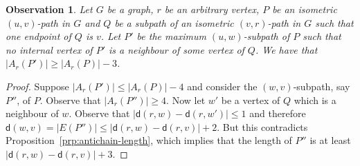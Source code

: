 \documentclass[a4paper]{article}
\newcommand{\dist}[2]{\mathsf{d}\left(#1,#2\right)}
\newcommand{\anticp}[2]{A_{#1}\left(#2\right)}
\newtheorem{observation}[theorem]{Observation}
\newtheorem{definition}[theorem]{Definition}
\begin{document}



\begin{observation}\label{obs:anti-cp-reduc}
\sloppy Let $G$ be a graph, $r$ be an arbitrary vertex, $P$ be an isometric $(u,v)$-path in $G$ and $Q$ be a subpath of an isometric $(v,r)$-path in $G$ such that one endpoint of $Q$ is $v$. Let $P'$ be the maximum $(u,w)$-subpath of $P$ such that no internal vertex of $P'$ is a neighbour of some vertex of $Q$. We have that $|\anticp{r}{P'}| \geq |\anticp{r}{P}| - 3$. 
\end{observation}

 \begin{proof}
 Suppose $|\anticp{r}{P'}| \leq |\anticp{r}{P}| - 4$ and consider the $(w,v)$-subpath, say $P''$, of $P$. Observe that $|\anticp{r}{P''}| \geq 4$. Now let $w'$ be a vertex of $Q$ which is a neighbour of $w$. Observe that $|\dist{r}{w} - \dist{r}{w'}| \leq 1$ and therefore $\dist{w}{v} = |E(P'')| \leq |\dist{r}{w} - \dist{r}{v}| + 2 $. But this contradicts Proposition~\ref{prp:antichain-length}, which implies that the length of $P''$ is at least $|\dist{r}{w} - \dist{r}{v}| + 3$.
 \end{proof}




 
    
     
\end{document}
